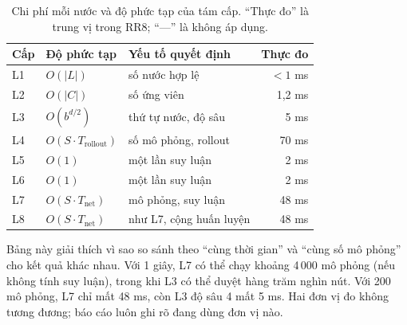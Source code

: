 \begin{table}[H]
  \centering\small
  \caption{Chi phí mỗi nước và độ phức tạp của tám cấp. ``Thực đo'' là trung vị trong RR8;
  ``—'' là không áp dụng.}
  \label{tab:pp-chi-phi-cap}
  \begin{tabularx}{\textwidth}{@{}l l X r@{}}
    \toprule
    \textbf{Cấp} & \textbf{Độ phức tạp} & \textbf{Yếu tố quyết định} & \textbf{Thực đo} \\
    \midrule
    L1 & $O(|L|)$ & số nước hợp lệ & $<1$ ms \\
    L2 & $O(|C|)$ & số ứng viên & 1,2 ms \\
    L3 & $O(b^{d/2})$ & thứ tự nước, độ sâu & 5 ms \\
    L4 & $O(S \cdot T_{\text{rollout}})$ & số mô phỏng, rollout & 70 ms \\
    L5 & $O(1)$ & một lần suy luận & 2 ms \\
    L6 & $O(1)$ & một lần suy luận & 2 ms \\
    L7 & $O(S \cdot T_{\text{net}})$ & mô phỏng, suy luận & 48 ms \\
    L8 & $O(S \cdot T_{\text{net}})$ & như L7, cộng huấn luyện & 48 ms \\
    \bottomrule
  \end{tabularx}
\end{table}

Bảng này giải thích vì sao so sánh theo ``cùng thời gian'' và ``cùng số mô phỏng'' cho kết quả
khác nhau. Với 1 giây, L7 có thể chạy khoảng 4\,000 mô phỏng (nếu không tính suy luận), trong
khi L3 có thể duyệt hàng trăm nghìn nút. Với 200 mô phỏng, L7 chỉ mất 48 ms, còn L3 độ sâu 4
mất 5 ms. Hai đơn vị đo không tương đương; báo cáo luôn ghi rõ đang dùng đơn vị nào.
